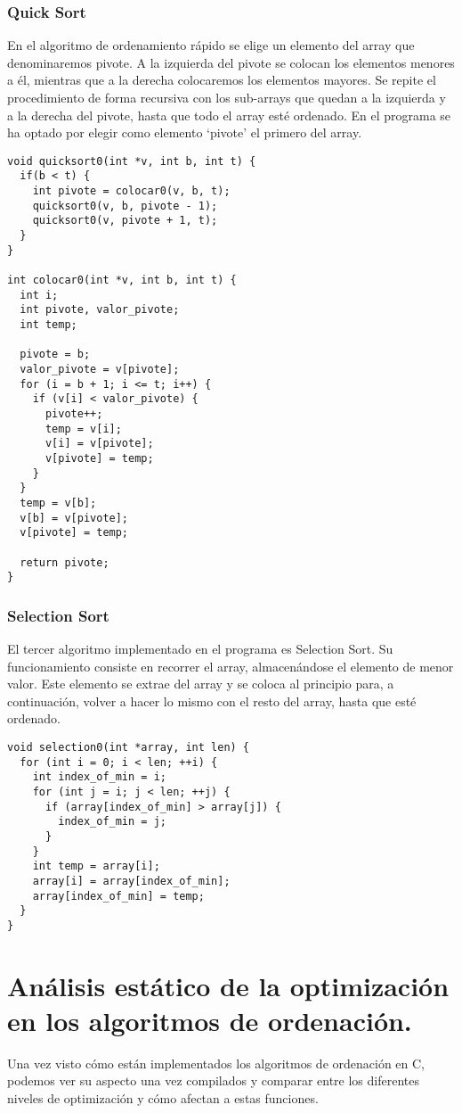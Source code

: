 \subsubsection{Quick Sort}
En el algoritmo de ordenamiento rápido se elige un elemento del array que denominaremos pivote. A la izquierda del pivote se colocan los elementos menores a él, mientras que a la derecha colocaremos los elementos mayores. Se repite el procedimiento de forma recursiva con los sub-arrays que quedan a la izquierda y a la derecha del pivote, hasta que todo el array esté ordenado. En el programa se ha optado por elegir como elemento `pivote' el primero del array.
\begin{lstlisting}[caption=Implementación de Quick Sort]
void quicksort0(int *v, int b, int t) {
  if(b < t) {
    int pivote = colocar0(v, b, t);
    quicksort0(v, b, pivote - 1);
    quicksort0(v, pivote + 1, t);
  }
}

int colocar0(int *v, int b, int t) {
  int i;
  int pivote, valor_pivote;
  int temp;

  pivote = b;
  valor_pivote = v[pivote];
  for (i = b + 1; i <= t; i++) {
    if (v[i] < valor_pivote) {
      pivote++;
      temp = v[i];
      v[i] = v[pivote];
      v[pivote] = temp;
    }
  }
  temp = v[b];
  v[b] = v[pivote];
  v[pivote] = temp;

  return pivote;
}
\end{lstlisting}

\subsubsection{Selection Sort}
El tercer algoritmo implementado en el programa es Selection Sort. Su funcionamiento consiste en recorrer el array, almacenándose el elemento de menor valor. Este elemento se extrae del array y se coloca al principio para, a continuación, volver a hacer lo mismo con el resto del array, hasta que esté ordenado.

\begin{lstlisting}[caption=Implementación de Selection Sort]
void selection0(int *array, int len) {
  for (int i = 0; i < len; ++i) {
    int index_of_min = i;
    for (int j = i; j < len; ++j) {
      if (array[index_of_min] > array[j]) {
        index_of_min = j;
      }
    }
    int temp = array[i];
    array[i] = array[index_of_min];
    array[index_of_min] = temp;
  }
}
\end{lstlisting}

\section{Análisis estático de la optimización en los algoritmos de ordenación.}
Una vez visto cómo están implementados los algoritmos de ordenación en C, podemos ver su aspecto una vez compilados y comparar entre los diferentes niveles de optimización y cómo afectan a estas funciones.

